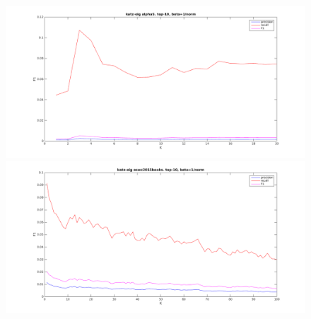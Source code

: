 \begin{figure}[h!]
\centering
\begin{minipage}{.5\textwidth}
    \centering
    \includegraphics[width=\linewidth]{fig/katzeig_k/alphaS_katzeig_K.png}
\end{minipage}%
\begin{minipage}{.5\textwidth}
    \centering
    \includegraphics[width=\linewidth]{fig/katzeig_k/eswc2015books_katzeig_K.png}
\end{minipage}
\end{figure}

